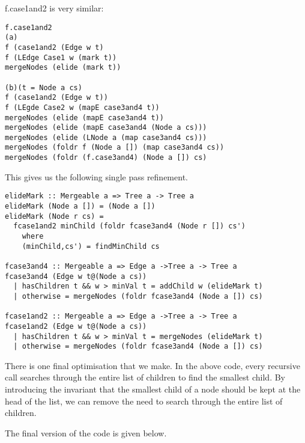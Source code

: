 \documentclass{jfp}
\begin{document}
f.case1and2 is very similar:

\begin{verbatim}
f.case1and2
(a)
f (case1and2 (Edge w t)
f (LEdge Case1 w (mark t))
mergeNodes (elide (mark t))

(b)(t = Node a cs)
f (case1and2 (Edge w t))
f (LEgde Case2 w (mapE case3and4 t))
mergeNodes (elide (mapE case3and4 t))
mergeNodes (elide (mapE case3and4 (Node a cs)))
mergeNodes (elide (LNode a (map case3and4 cs)))
mergeNodes (foldr f (Node a []) (map case3and4 cs))
mergeNodes (foldr (f.case3and4) (Node a []) cs)

\end{verbatim}

This gives us the following single pass refinement.

\begin{verbatim}
elideMark :: Mergeable a => Tree a -> Tree a
elideMark (Node a []) = (Node a [])
elideMark (Node r cs) =
  fcase1and2 minChild (foldr fcase3and4 (Node r []) cs')
    where
    (minChild,cs') = findMinChild cs

fcase3and4 :: Mergeable a => Edge a ->Tree a -> Tree a
fcase3and4 (Edge w t@(Node a cs))
  | hasChildren t && w > minVal t = addChild w (elideMark t)
  | otherwise = mergeNodes (foldr fcase3and4 (Node a []) cs)

fcase1and2 :: Mergeable a => Edge a ->Tree a -> Tree a
fcase1and2 (Edge w t@(Node a cs))
  | hasChildren t && w > minVal t = mergeNodes (elideMark t)
  | otherwise = mergeNodes (foldr fcase3and4 (Node a []) cs)

\end{verbatim}

There is one final optimisation that we make. In the above code, every
recursive call searches through the entire list of children to find
the smallest child. By introducing the invariant that the smallest
child of a node should be kept at the head of the list, we can remove
the need to search through the entire list of children.

The final version of the code is given below.
\end{document}
